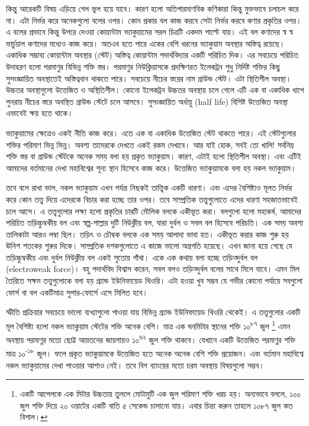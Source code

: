 \documentclass[
]{book}
\begin{document}
কিন্তু আরেকটি বিষয় এড়িয়ে গেল ভুল হয়ে যাবে। কারণ হলো অতিপারমাণবিক কণিকারা কিন্তু মুক্তভাবে চলাচল করে না। এটা নির্ভর করে অনেকগুলো বলের ওপর। কোন প্রকার বল কাজ করবে সেটা নির্ভর করবে কণার প্রকৃতির ওপর। এ বলের প্রভাবে কিন্তু উপরে দেওয়া কোয়ান্টাম ভ্যাকুয়ামের সরল চিত্রটি একদম পাল্টে যায়। এই বল কণাদের স্ব স্ব ভার্চুয়াল কণাদের মধ্যেও কাজ করে। অতএব হতে পারে একের বেশি ধরনের ভ্যাকুয়াম অবস্থার অস্তিত্ব রয়েছে। একাধিক সম্ভাব্য কোয়ান্টাম অবস্থার (স্টেট) অস্তিত্ব কোয়ান্টাম পদার্থবিদ্যার একটি পরিচিত দিক। এর সবচেয়ে পরিচিত উদাহরণ হলো পরমাণুর বিভিন্ন শক্তি স্তর। পরমাণুর নিউক্লিয়াসকে প্রদক্ষিণরত ইলেকট্রন শুধু নির্দিষ্ট শক্তির কিছু সুসংজ্ঞায়িত অবস্থাতেই অস্তিত্ববান থাকতে পারে। সবচেয়ে নীচের স্তরের নাম গ্রাউন্ড স্টেট। এটা স্থিতিশীল অবস্থা। উচ্চতর অবস্থাগুলো উত্তেজিত ও অস্থিতিশীল। কোনো ইলেকট্রন উচ্চতর অবস্থায় চলে গেলে এটি এক বা একাধিক ধাপে পুনরায় নীচের স্তরে অবস্থিত গ্রাউন্ড স্টেটে চলে আসবে। সুসংজ্ঞায়িত অর্ধায়ু (half life) বিশিষ্ট উত্তেজিত অবস্থা এভাবেই ক্ষয় হতে থাকে।

ভ্যাকুয়ামের ক্ষেত্রেও একই নীতি কাজ করে। এতে এক বা একাধিক উত্তেজিত স্টেট থাকতে পারে। এই স্টেটগুলোর শক্তির পরিমাণ ভিন্ন ভিন্ন। অবশ্য তাদেরকে দেখতে একই রকম দেখাবে। আর যাই হোক, সবই তো খালি! সর্বনিম্ন শক্তি স্তর বা গ্রাউন্ড স্টেটকে অনেক সময় বলা হয় প্রকৃত ভ্যাকুয়াম। কারণ, এটাই হলো স্থিতিশীল অবস্থা। এবং এটিই আমাদের বর্তমানের দেখা মহাবিশ্বের শূন্য স্থান হিসেবে কাজ করে। উত্তেজিত ভ্যাকুয়ামকে বলা হয় নকল ভ্যাকুয়াম।

তবে বলে রাখা ভাল, নকল ভ্যাকুয়াম এখন পর্যন্ত নিছকই তাত্ত্বিক একটি ধারণা। এবং এদের বৈশিষ্ট্যও মূলত নির্ভর করে কোন তত্ত্ব দিয়ে এদেরকে বিচার করা হচ্ছে তার ওপর। তবে সাম্প্রতিক তত্ত্বগুলোতে এদের ধারণা সহজাতভাবেই চলে আসে। এ তত্ত্বগুলোর লক্ষ্য হলো প্রকৃতির চারটি মৌলিক বলকে একীভূত করা। বলগুলো হলো মহাকর্ষ, আমাদের পরিচিত তড়িচ্চুম্বকীয় বল এবং স্বল্প-পাল্লার দুটি নিউক্লীয় বল, যারা দুর্বল ও সবল বল হিসেবে পরিচতি। এক সময় অবশ্য তালিকাটা আরও লম্বা ছিল। তড়িৎ ও চৌম্বক বলকে এক সময় আলাদা ভাবা হত। একীভূত করার কাজ শুরু হয় ঊনিশ শতকের শুরুর দিকে। সাম্প্রতিক দশকগুলোতে এ কাজে ভালো অগ্রগতি হয়েছে। এখন জানা হয়ে গেছে যে তড়িচ্চুম্বকীয় এবং দুর্বল নিউক্লীয় বল একই সুতোয় গাঁথা। একে এক কথায় বলা হচ্ছে তড়িত্দুর্বল বল (electroweak force)। বহু পদার্থবিদ বিশ্বাস করেন, সবল বলও তড়িত্দুর্বল বলের সাথে মিলে যাবে। এমন মিল তৈরিতে সক্ষম তত্ত্বগুলোকে বলা হয় গ্র্যান্ড ইউনিফায়েড থিওরি। এটা হওয়া খুব সম্ভব যে গভীর কোনো পর্যায়ে সবগুলো ফোর্স বা বল একটিমাত্র সুপার-ফোর্সে এসে মিলিত হবে।

স্ফীতি প্রক্রিয়ার সবচেয়ে ভালো ব্যখ্যাগুলো পাওয়া যায় বিভিন্ন গ্র্যান্ড ইউনিফায়েড থিওরি থেকেই। এ তত্ত্বগুলোর একটি মূল বৈশিষ্ট্য হলো নকল ভ্যাকুয়াম স্টেটের শক্তি অনেক বেশি। মাত্র এক ঘনমিটার স্থানের শক্তি ১০\textsuperscript{৮৭} জুল \footnote{একটি আপেলকে এক মিটার উচ্চতায় তুললে মোটামুটি এক জুল পরিমাণ শক্তি খরচ হয়। অন্যভাবে বললে, ১০০ জুল শক্তি দিয়ে ২০ ওয়াটের একটি বাতি ৫ সেকেন্ড চালানো যায়। এবার চিন্তা করুন তাহলে ১০৮৭ জুল কত বিশাল।} এমন অবস্থায় পরমাণুর মতো ছোট্ট আয়তনের জায়গায়ও ১০\textsuperscript{৬২} জুল শক্তি থাকবে। যেখানে একটি উত্তেজিত পরমাণুর শক্তি মাত্র ১০\textsuperscript{-১৮} জুল। ফলে প্রকৃত ভ্যাকুয়ামকে উত্তেজিত হতে অনেক অনেক বেশি শক্তি প্রয়োজন। এবং বর্তমান মহাবিশ্বে নকল ভ্যাকুয়ামের দেখা পাওয়ার আশাও নেই। তবে বিগ ব্যাংয়ের মতো চরম অবস্থায় বিষয়গুলো সম্ভব।
\end{document}
